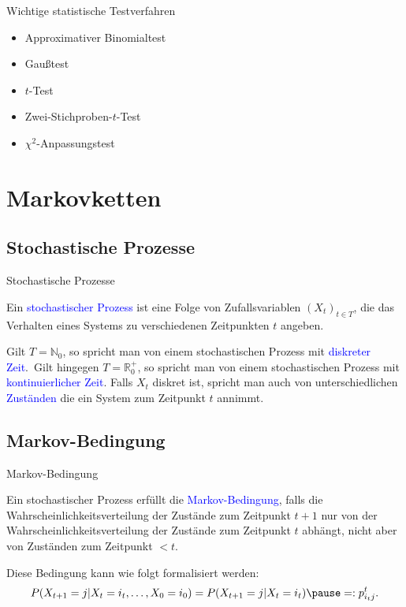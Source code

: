 \documentclass{beamer}
\def\spadding{\vspace{0.25cm}}
\def\b{\textcolor{blue}}
\begin{document}
\begin{frame}
    \begin{block}{Wichtige statistische Testverfahren}\pause
        \begin{itemize}
            \item Approximativer Binomialtest\pause
            \item Gaußtest\pause
            \item $t$-Test\pause
            \item Zwei-Stichproben-$t$-Test\pause
            \item $\chi^2$-Anpassungstest
        \end{itemize}
    \end{block}
\end{frame}

\section{Markovketten}
\subsection{Stochastische Prozesse}
\begin{frame}{Stochastische Prozesse}
    \begin{definition}
        Ein \b{stochastischer Prozess} ist eine Folge von Zufallsvariablen $(X_t)_{t \in T}$, die das Verhalten eines Systems zu verschiedenen Zeitpunkten $t$ angeben.\pause\par\spadding
        Gilt $T = \mathbb{N}_0$, so spricht man von einem stochastischen Prozess mit \b{diskreter Zeit}.\pause\ Gilt hingegen $T = \mathbb{R}_0^+$, so spricht man von einem stochastischen Prozess mit \b{kontinuierlicher Zeit}.
        Falls $X_t$ diskret ist, spricht man auch von unterschiedlichen \b{Zuständen} die ein System zum Zeitpunkt $t$ annimmt.
    \end{definition}
\end{frame}

\subsection{Markov-Bedingung}
\begin{frame}{Markov-Bedingung}
    \begin{definition}
        Ein stochastischer Prozess erfüllt die \b{Markov-Bedingung}, falls die Wahrscheinlichkeitsverteilung der Zustände zum Zeitpunkt $t + 1$ nur von der Wahrscheinlichkeitsverteilung der Zustände zum Zeitpunkt $t$ abhängt, nicht aber von Zuständen zum Zeitpunkt $< t$.\pause\par\spadding
        Diese Bedingung kann wie folgt formalisiert werden:
        \begin{align*}
            P(X_{t+1} = j | X_t = i_t, \dots, X_0 = i_0) = P(X_{t+1} = j | X_t = i_t)\pause =: p_{i_t j}^t.
        \end{align*}
    \end{definition}
\end{frame}
\end{document}
